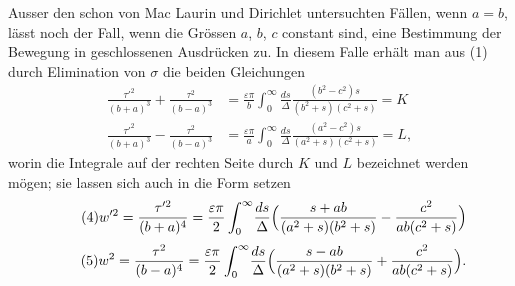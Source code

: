 \documentclass[12pt,a4paper]{article}
\begin{document}
Ausser den schon von Mac Laurin und Dirichlet untersuchten Fällen, wenn $a = b$, lässt noch der Fall, wenn die Grössen $a$, $b$, $c$ constant sind, eine Bestimmung der Bewegung in geschlossenen Ausdrücken zu. In diesem Falle erhält man aus (1) durch Elimination von $\sigma$ die beiden Gleichungen
\begin{equation}
\tag{3}
\begin{aligned}
\frac{\tau'^2}{(b+a)^3} + \frac{\tau^2}{(b-a)^3} &= \frac{\varepsilon\pi}{b}\int_0^{\infty}\!\frac{ds}{\Delta}\frac{(b^2-c^2)s}{(b^2+s)(c^2+s)} = K\\
\frac{\tau'^2}{(b+a)^3} - \frac{\tau^2}{(b-a)^3} &= \frac{\varepsilon\pi}{a}\int_0^{\infty}\!\frac{ds}{\Delta}\frac{(a^2-c^2)s}{(a^2+s)(c^2+s)} = L,
\end{aligned}
\end{equation}
worin die Integrale auf der rechten Seite durch $K$ und $L$ bezeichnet werden mögen; sie lassen sich auch in die Form setzen
\begin{equation}
\tag{4} w'^2 = \frac{\tau'^2}{(b+a)^4} = \frac{\varepsilon\pi}{2}\int_0^{\infty}\!\frac{ds}{\Delta}\Bigl(\frac{s+ab}{(a^2+s)(b^2+s)} - \frac{c^2}{ab(c^2+s)}\Bigr) \end{equation}
\begin{equation}
\tag{5} w^2 = \frac{\tau^2}{(b-a)^4} = \frac{\varepsilon\pi}{2}\int_0^{\infty}\!\frac{ds}{\Delta}\Bigl(\frac{s-ab}{(a^2+s)(b^2+s)} + \frac{c^2}{ab(c^2+s)}\Bigr). \end{equation}
\end{document}
